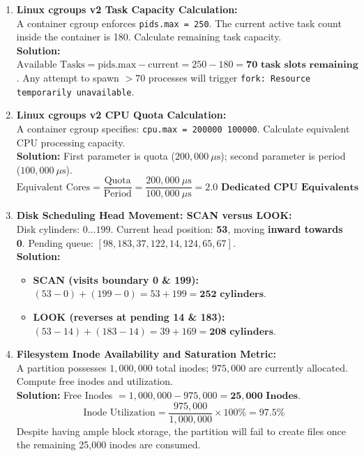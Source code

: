 \begin{enumerate}[label=\textbf{Problem \arabic*.},leftmargin=1.5cm]
\item \textbf{Linux cgroups v2 Task Capacity Calculation:} \\
A container cgroup enforces \texttt{pids.max = 250}. The current active task count inside the container is 180. Calculate remaining task capacity. \\
\textbf{Solution:} $\text{Available Tasks} = \text{pids.max} - \text{current} = 250 - 180 = \mathbf{70\text{ task slots remaining}}$. Any attempt to spawn $> 70$ processes will trigger \texttt{fork: Resource temporarily unavailable}.

\item \textbf{Linux cgroups v2 CPU Quota Calculation:} \\
A container cgroup specifies: \texttt{cpu.max = 200000 100000}. Calculate equivalent CPU processing capacity. \\
\textbf{Solution:} First parameter is quota ($200,000\ \mu\text{s}$); second parameter is period ($100,000\ \mu\text{s}$).
\[
\text{Equivalent Cores} = \frac{\text{Quota}}{\text{Period}} = \frac{200,000\ \mu\text{s}}{100,000\ \mu\text{s}} = \mathbf{2.0\text{ Dedicated CPU Equivalents}}
\]

\item \textbf{Disk Scheduling Head Movement: SCAN versus LOOK:} \\
Disk cylinders: $0\dots 199$. Current head position: \textbf{53}, moving \textbf{inward towards 0}. Pending queue: $[98, 183, 37, 122, 14, 124, 65, 67]$. \\
\textbf{Solution:}
\begin{itemize}
    \item \textbf{SCAN (visits boundary 0 \& 199):} $(53 - 0) + (199 - 0) = 53 + 199 = \mathbf{252\text{ cylinders}}$.
    \item \textbf{LOOK (reverses at pending 14 \& 183):} $(53 - 14) + (183 - 14) = 39 + 169 = \mathbf{208\text{ cylinders}}$.
\end{itemize}

\item \textbf{Filesystem Inode Availability and Saturation Metric:} \\
A partition possesses $1,000,000$ total inodes; $975,000$ are currently allocated. Compute free inodes and utilization. \\
\textbf{Solution:} Free Inodes $= 1,000,000 - 975,000 = \mathbf{25,000\text{ Inodes}}$.
\[
\text{Inode Utilization} = \frac{975,000}{1,000,000} \times 100\% = \mathbf{97.5\%}
\]
Despite having ample block storage, the partition will fail to create files once the remaining 25,000 inodes are consumed.


\end{enumerate}
